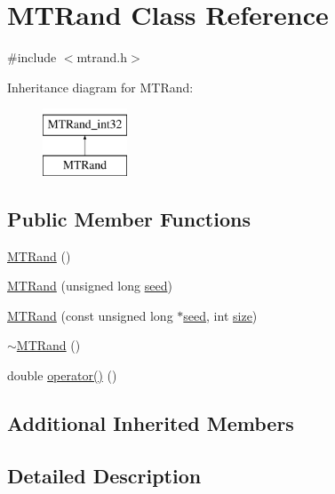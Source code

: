 \hypertarget{class_m_t_rand}{\section{M\-T\-Rand Class Reference}
\label{class_m_t_rand}
}


{\ttfamily \#include $<$mtrand.\-h$>$}

Inheritance diagram for M\-T\-Rand\-:\begin{figure}[H]
\begin{center}
\leavevmode
\includegraphics[height=2.000000cm]{class_m_t_rand}
\end{center}
\end{figure}
\subsection*{Public Member Functions}
\begin{DoxyCompactItemize}
\item 
\hyperlink{class_m_t_rand_a265dc65546e26073c0d5f8787b045a1d}{M\-T\-Rand} ()
\item 
\hyperlink{class_m_t_rand_a2c88736896bcbdb54bcdd7a0026720d5}{M\-T\-Rand} (unsigned long \hyperlink{class_m_t_rand__int32_a0c57076fe30358e0700a7ce1baa0ea27}{seed})
\item 
\hyperlink{class_m_t_rand_a6075a3beacdfb8e4cf48d9fb56cc193a}{M\-T\-Rand} (const unsigned long $\ast$\hyperlink{class_m_t_rand__int32_a0c57076fe30358e0700a7ce1baa0ea27}{seed}, int \hyperlink{crea__e__controlla__i__catalizzatori_8m_ae113ea7f9e515a12ac4b5595c6faf61e}{size})
\item 
\hyperlink{class_m_t_rand_a8c276546a41ae350dc9efc5e9c10a261}{$\sim$\-M\-T\-Rand} ()
\item 
double \hyperlink{class_m_t_rand_abbb87a08d622d58fdee0eea4cb5471a0}{operator()} ()
\end{DoxyCompactItemize}
\subsection*{Additional Inherited Members}


\subsection{Detailed Description}


